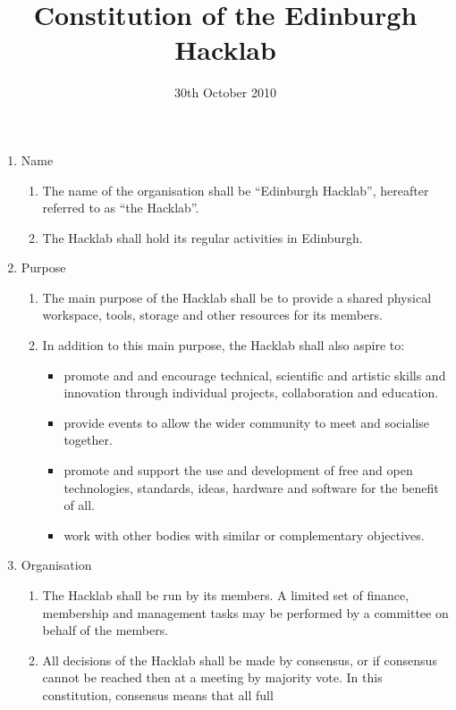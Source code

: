 \documentclass{article}
\title{Constitution of the Edinburgh Hacklab}
\date{30th October 2010}
\begin{document}
\maketitle
\begin{enumerate}
  \item Name
    \begin{enumerate}
      \item The name of the organisation shall be ``Edinburgh
        Hacklab'', hereafter referred to as ``the Hacklab''.
      \item The Hacklab shall hold its regular activities in Edinburgh.
    \end{enumerate} %
  \item Purpose
    \begin{enumerate}
    \item The main purpose of the Hacklab shall be to provide a shared
      physical workspace, tools, storage and other resources for its
      members.
      \item In addition to this main purpose, the Hacklab shall also aspire to:
        \begin{itemize}
        \item promote and and encourage technical, scientific and
          artistic skills and innovation through individual projects,
          collaboration and education.
        \item provide events to allow the wider community to meet and
          socialise together. 
          \item promote and support the use and development of free
            and open technologies, standards, ideas, hardware and
            software for the benefit of all.
          \item work with other bodies with similar or complementary
            objectives.
        \end{itemize}
    \end{enumerate} %
  \item Organisation
    \begin{enumerate}
    \item The Hacklab shall be run by its members. A limited set of
      finance, membership and management tasks may be performed by a
      committee on behalf of the members.
    \item All decisions of the Hacklab shall be made by consensus, or
      if consensus cannot be reached then at a meeting by majority
      vote. In this constitution, consensus means that all full

\end{enumerate}
\end{enumerate}
\end{document}
